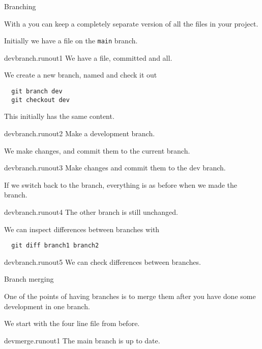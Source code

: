 \newpage
{} {Branching}

With a  you can keep a completely
separate version of all the files in your project.

Initially we have a file on the \lstinline{main} branch.

\begin{gitstep}{devbranch.runout1}
  We have a file, committed and all.
\end{gitstep}

We create a new branch, named 
and check it out
\begin{lstlisting}
  git branch dev
  git checkout dev
\end{lstlisting}
This initially has the same content.

\begin{gitstep}{devbranch.runout2}
  Make a development branch.
\end{gitstep}

We make changes, and commit them to the current branch.

\begin{gitstep}{devbranch.runout3}
  Make changes and commit them to the dev branch.
\end{gitstep}

If we switch back to the  branch,
everything is as before when we made the  branch.

\begin{gitstep}{devbranch.runout4}
  The other branch is still unchanged.
\end{gitstep}

We can inspect differences between branches with 
\begin{lstlisting}
  git diff branch1 branch2
\end{lstlisting}

\begin{gitstep}{devbranch.runout5}
  We can check differences between branches.
\end{gitstep}

\newpage
{} {Branch merging}
\label{sec:git-branch-merge}

One of the points of having branches is to merge
them after you have done some development in one branch.

We start with the four line file from before.

\begin{gitstep}{devmerge.runout1}
  The main branch is up to date.
\end{gitstep}

